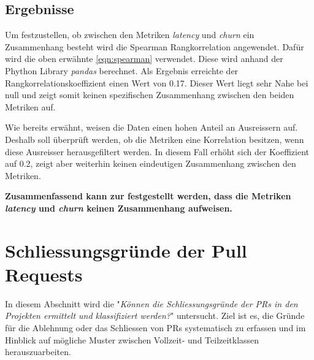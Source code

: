 \subsection{Ergebnisse}
Um festzustellen, ob zwischen den Metriken \textit{latency} und \textit{churn} ein Zusammenhang besteht wird die Spearman Rangkorrelation angewendet. Dafür wird die oben erwähnte \autoref{eqn:spearman} verwendet. Diese wird anhand der Phython Library \textit{pandas} berechnet. Als Ergebnis erreichte der Rangkorrelationskoeffizient einen Wert von 0.17. Dieser Wert liegt sehr Nahe bei null und zeigt somit keinen spezifischen Zusammenhang zwischen den beiden Metriken auf. 

Wie bereits erwähnt, weisen die Daten einen hohen Anteil an Ausreissern auf. Deshalb soll überprüft werden, ob die Metriken eine Korrelation besitzen, wenn diese Ausreisser herausgefiltert werden. In diesem Fall erhöht sich der Koeffizient auf 0.2, zeigt aber weiterhin keinen eindeutigen Zusammenhang zwischen den Metriken.

\textbf{Zusammenfassend kann zur  festgestellt werden, dass die Metriken \textit{latency} und \textit{churn} keinen Zusammenhang aufweisen.}

\section{Schliessungsgründe der Pull Requests}
\label{sec:UntersuchungSchliessgründePRs} 
In diesem Abschnitt wird die  "\textit{Können die Schliessungsgründe der PRs in den Projekten ermittelt und klassifiziert werden?}" untersucht. Ziel ist es, die Gründe für die Ablehnung oder das Schliessen von PRs systematisch zu erfassen und im Hinblick auf  mögliche Muster zwischen Vollzeit- und Teilzeitklassen herauszuarbeiten.

